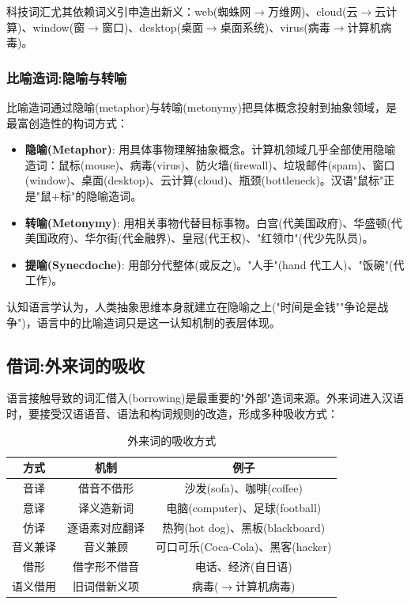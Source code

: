 科技词汇尤其依赖词义引申造出新义：web(蜘蛛网$\rightarrow$万维网)、cloud(云$\rightarrow$云计算)、window(窗$\rightarrow$窗口)、desktop(桌面$\rightarrow$桌面系统)、virus(病毒$\rightarrow$计算机病毒)。

\subsubsection{比喻造词:隐喻与转喻}

比喻造词通过隐喻(metaphor)与转喻(metonymy)把具体概念投射到抽象领域，是最富创造性的构词方式：

\begin{itemize}
    \item \textbf{隐喻(Metaphor)}: 用具体事物理解抽象概念。计算机领域几乎全部使用隐喻造词：鼠标(mouse)、病毒(virus)、防火墙(firewall)、垃圾邮件(spam)、窗口(window)、桌面(desktop)、云计算(cloud)、瓶颈(bottleneck)。汉语"鼠标"正是"鼠+标"的隐喻造词。
    \item \textbf{转喻(Metonymy)}: 用相关事物代替目标事物。白宫(代美国政府)、华盛顿(代美国政府)、华尔街(代金融界)、皇冠(代王权)、"红领巾"(代少先队员)。
    \item \textbf{提喻(Synecdoche)}: 用部分代整体(或反之)。"人手"(hand 代工人)、"饭碗"(代工作)。
\end{itemize}

认知语言学认为，人类抽象思维本身就建立在隐喻之上("时间是金钱""争论是战争")，语言中的比喻造词只是这一认知机制的表层体现。

\subsection{借词:外来词的吸收}

语言接触导致的词汇借入(borrowing)是最重要的"外部"造词来源。外来词进入汉语时，要接受汉语语音、语法和构词规则的改造，形成多种吸收方式：

\begin{table}[H]
\centering
\caption{外来词的吸收方式}
\begin{tabulary}{\textwidth}{@{}CCC@{}}
\toprule
\textbf{方式} & \textbf{机制} & \textbf{例子} \\
\midrule
音译 & 借音不借形 & 沙发(sofa)、咖啡(coffee) \\
意译 & 译义造新词 & 电脑(computer)、足球(football) \\
仿译 & 逐语素对应翻译 & 热狗(hot dog)、黑板(blackboard) \\
音义兼译 & 音义兼顾 & 可口可乐(Coca-Cola)、黑客(hacker) \\
借形 & 借字形不借音 & 电话、经济(自日语) \\
语义借用 & 旧词借新义项 & 病毒($\rightarrow$计算机病毒) \\
\bottomrule
\end{tabulary}
\end{table}

